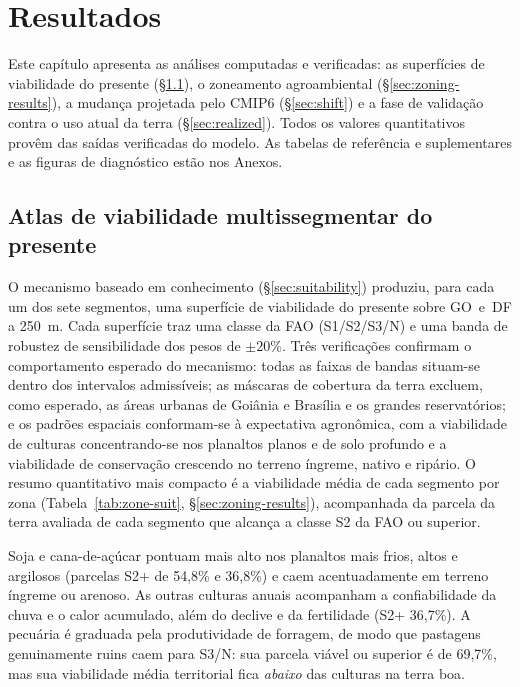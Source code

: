 \chapter{Resultados}\label{ch:results}

Este capítulo apresenta as análises computadas e verificadas: as superfícies de viabilidade
do presente (\S\ref{sec:atlas-present}), o zoneamento agroambiental
(\S\ref{sec:zoning-results}), a mudança projetada pelo CMIP6 (\S\ref{sec:shift}) e a fase de
validação contra o uso atual da terra (\S\ref{sec:realized}). Todos os valores quantitativos provêm
das saídas verificadas do modelo. As tabelas de referência e suplementares e as figuras de
diagnóstico estão nos Anexos.

\section{Atlas de viabilidade multissegmentar do presente}\label{sec:atlas-present}


O mecanismo baseado em conhecimento (\S\ref{sec:suitability}) produziu, para cada um dos sete
segmentos, uma superfície de viabilidade do presente sobre GO~e~DF a 250~m. Cada superfície
traz uma classe da FAO (S1/S2/S3/N) e uma banda de robustez de sensibilidade dos pesos de
$\pm 20\%$. Três verificações confirmam o comportamento esperado do mecanismo: todas as faixas
de bandas situam-se dentro dos intervalos admissíveis; as máscaras de cobertura da terra
excluem, como esperado, as áreas urbanas de Goiânia e Brasília e os grandes reservatórios; e os
padrões espaciais conformam-se à expectativa agronômica, com a viabilidade de culturas
concentrando-se nos planaltos planos e de solo profundo e a viabilidade de conservação
crescendo no terreno íngreme, nativo e ripário. O resumo quantitativo mais compacto é a
viabilidade média de cada segmento por zona (Tabela~\ref{tab:zone-suit}, \S\ref{sec:zoning-results}),
acompanhada da parcela da terra avaliada de cada segmento que alcança a classe S2 da FAO ou
superior.

Soja e cana-de-açúcar pontuam mais alto nos planaltos mais frios, altos e argilosos (parcelas
S2+ de 54,8\% e 36,8\%) e caem acentuadamente em terreno íngreme ou arenoso. As outras culturas
anuais acompanham a confiabilidade da chuva e o calor acumulado, além do declive e da
fertilidade (S2+ 36,7\%). A pecuária é graduada pela produtividade de forragem, de modo que
pastagens genuinamente ruins caem para S3/N: sua parcela viável ou superior é de 69,7\%, mas
sua viabilidade média territorial fica \emph{abaixo} das culturas na terra boa.

